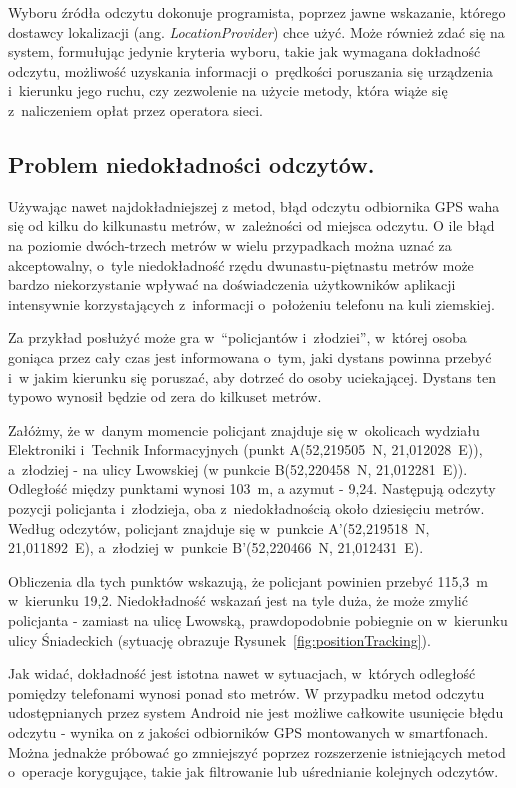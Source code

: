 \documentclass[a4paper,twocolumn,11pt]{article}
\begin{document}
Wyboru źródła odczytu dokonuje programista, poprzez jawne wskazanie, którego dostawcy lokalizacji (ang. \emph{LocationProvider}) chce użyć.
Może również zdać się na system, formułując jedynie kryteria wyboru, takie jak wymagana dokładność odczytu, możliwość uzyskania informacji o~prędkości poruszania się urządzenia i~kierunku jego ruchu, czy zezwolenie na użycie metody, która wiąże się z~naliczeniem opłat przez operatora sieci.


\subsection{Problem niedokładności odczytów.}
 Używając nawet najdokładniejszej z metod, błąd odczytu odbiornika GPS waha się od kilku do kilkunastu metrów, w~zależności od miejsca odczytu.
 O ile błąd na poziomie dwóch-trzech metrów w wielu przypadkach można uznać za akceptowalny, o~tyle niedokładność rzędu dwunastu-piętnastu metrów może bardzo niekorzystanie wpływać na doświadczenia użytkowników aplikacji intensywnie korzystających z~informacji o~położeniu telefonu na kuli ziemskiej.
 
 Za przykład posłużyć może gra w~``policjantów i~złodziei'', w~której osoba goniąca przez cały czas jest informowana o~tym, jaki dystans powinna przebyć i~w jakim kierunku się poruszać, aby dotrzeć do osoby uciekającej.
 Dystans ten typowo wynosił będzie od zera do kilkuset metrów.
 
 Załóżmy, że w~danym momencie policjant znajduje się w~okolicach wydziału Elektroniki i~Technik Informacyjnych (punkt A(52,219505\textdegree~N, 21,012028\textdegree~E)), a~złodziej - na ulicy Lwowskiej (w punkcie B(52,220458\textdegree~N, 21,012281\textdegree~E)).
 Odległość między punktami wynosi 103~m, a azymut - 9,24\textdegree.
 Następują odczyty pozycji policjanta i~złodzieja, oba z~niedokładnością około dziesięciu metrów.
 Według odczytów, policjant znajduje się w~punkcie A'(52,219518\textdegree~N, 21,011892\textdegree~E), a~złodziej w~punkcie B'(52,220466\textdegree~N, 21,012431\textdegree~E).
 
 Obliczenia dla tych punktów wskazują, że policjant powinien przebyć 115,3~m w~kierunku 19,2\textdegree.
 Niedokładność wskazań jest na tyle duża, że może zmylić policjanta - zamiast na ulicę Lwowską, prawdopodobnie pobiegnie on w~kierunku ulicy Śniadeckich (sytuację obrazuje Rysunek~\ref{fig:positionTracking}).


 
 Jak widać, dokładność jest istotna nawet w sytuacjach, w~których odległość pomiędzy telefonami wynosi ponad sto metrów.
 W przypadku metod odczytu udostępnianych przez system Android nie jest możliwe całkowite usunięcie błędu odczytu - wynika on z jakości odbiorników GPS montowanych w smartfonach. Można jednakże próbować go zmniejszyć poprzez rozszerzenie istniejących metod o~operacje korygujące, takie jak filtrowanie lub uśrednianie kolejnych odczytów.
\end{document}
